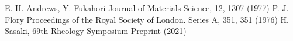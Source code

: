 \documentclass[uplatex,dvipdfmx,a4paper,12pt]{article}
\begin{document}
\vspace{-3mm}
\begin{thebibliography}{99}
    \small %
    \setlength{\itemsep}{-2pt} %
     E. H. Andrews, Y. Fukahori Journal of Materials Science, 12, 1307 (1977)
     P. J. Flory Proceedings of the Royal Society of London. Series A, 351, 351 (1976)
     H. Sasaki, 69th Rheology Symposium Preprint (2021)
\end{thebibliography}
\end{document}
